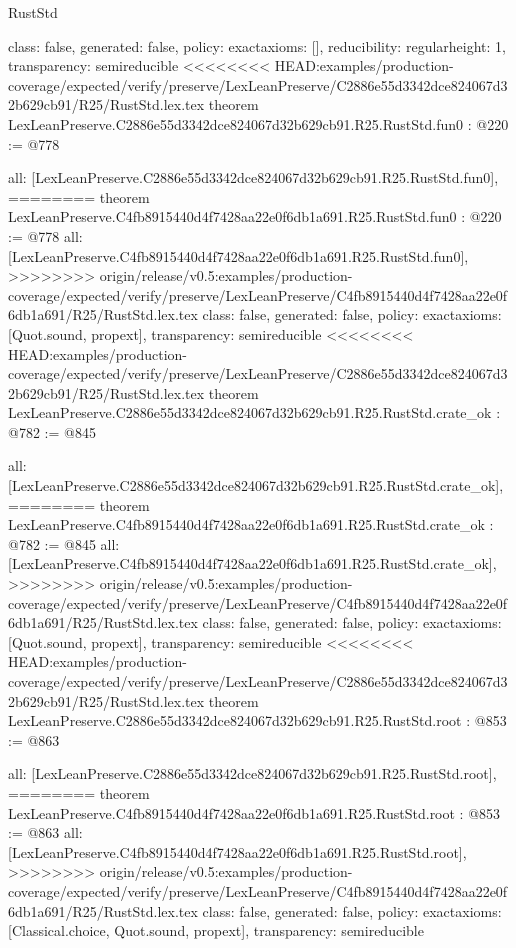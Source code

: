 \begin{lexlean}{RustStd}
\begin{coremodule}
{\begin{coremodule}
{{{  class: false,
  generated: false,
  policy: exact{axioms: []},
  reducibility: regular{height: 1},
  transparency: semireducible
}
<<<<<<<< HEAD:examples/production-coverage/expected/verify/preserve/LexLeanPreserve/C2886e55d3342dce824067d32b629cb91/R25/RustStd.lex.tex
theorem LexLeanPreserve.C2886e55d3342dce824067d32b629cb91.R25.RustStd.fun0 : @220 := @778 {
  all: [LexLeanPreserve.C2886e55d3342dce824067d32b629cb91.R25.RustStd.fun0],
========
theorem LexLeanPreserve.C4fb8915440d4f7428aa22e0f6db1a691.R25.RustStd.fun0 : @220 := @778 {
  all: [LexLeanPreserve.C4fb8915440d4f7428aa22e0f6db1a691.R25.RustStd.fun0],
>>>>>>>> origin/release/v0.5:examples/production-coverage/expected/verify/preserve/LexLeanPreserve/C4fb8915440d4f7428aa22e0f6db1a691/R25/RustStd.lex.tex
  class: false,
  generated: false,
  policy: exact{axioms: [Quot.sound, propext]},
  transparency: semireducible
}
<<<<<<<< HEAD:examples/production-coverage/expected/verify/preserve/LexLeanPreserve/C2886e55d3342dce824067d32b629cb91/R25/RustStd.lex.tex
theorem LexLeanPreserve.C2886e55d3342dce824067d32b629cb91.R25.RustStd.crate_ok : @782 := @845 {
  all: [LexLeanPreserve.C2886e55d3342dce824067d32b629cb91.R25.RustStd.crate_ok],
========
theorem LexLeanPreserve.C4fb8915440d4f7428aa22e0f6db1a691.R25.RustStd.crate_ok : @782 := @845 {
  all: [LexLeanPreserve.C4fb8915440d4f7428aa22e0f6db1a691.R25.RustStd.crate_ok],
>>>>>>>> origin/release/v0.5:examples/production-coverage/expected/verify/preserve/LexLeanPreserve/C4fb8915440d4f7428aa22e0f6db1a691/R25/RustStd.lex.tex
  class: false,
  generated: false,
  policy: exact{axioms: [Quot.sound, propext]},
  transparency: semireducible
}
<<<<<<<< HEAD:examples/production-coverage/expected/verify/preserve/LexLeanPreserve/C2886e55d3342dce824067d32b629cb91/R25/RustStd.lex.tex
theorem LexLeanPreserve.C2886e55d3342dce824067d32b629cb91.R25.RustStd.root : @853 := @863 {
  all: [LexLeanPreserve.C2886e55d3342dce824067d32b629cb91.R25.RustStd.root],
========
theorem LexLeanPreserve.C4fb8915440d4f7428aa22e0f6db1a691.R25.RustStd.root : @853 := @863 {
  all: [LexLeanPreserve.C4fb8915440d4f7428aa22e0f6db1a691.R25.RustStd.root],
>>>>>>>> origin/release/v0.5:examples/production-coverage/expected/verify/preserve/LexLeanPreserve/C4fb8915440d4f7428aa22e0f6db1a691/R25/RustStd.lex.tex
  class: false,
  generated: false,
  policy: exact{axioms: [Classical.choice, Quot.sound, propext]},
  transparency: semireducible
}

}}}}}
\end{coremodule}}
\end{coremodule}
\end{lexlean}
